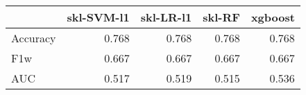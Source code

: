 \begin{tabular}{lrrrr}
\toprule
{} &  skl-SVM-l1 &  skl-LR-l1 &  skl-RF &  xgboost \\
\midrule
Accuracy &       0.768 &      0.768 &   0.768 &    0.768 \\
F1w      &       0.667 &      0.667 &   0.667 &    0.667 \\
AUC      &       0.517 &      0.519 &   0.515 &    0.536 \\
\bottomrule
\end{tabular}
